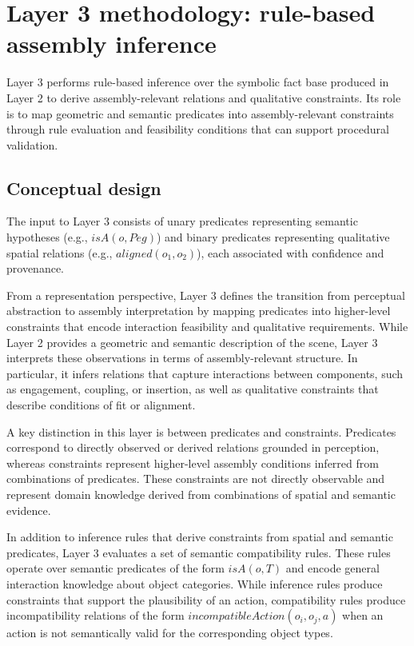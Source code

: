 \documentclass[11pt,titlepage,openright]{book}
\begin{document}
\section{Layer 3 methodology: rule-based assembly inference}
\label{sec:layer3-method}

Layer 3 performs rule-based inference over the symbolic fact base produced in Layer 2 to derive assembly-relevant relations and qualitative constraints. Its role is to map geometric and semantic predicates into assembly-relevant constraints through rule evaluation and feasibility conditions that can support procedural validation.

\subsection{Conceptual design}

The input to Layer 3 consists of unary predicates representing semantic hypotheses (e.g., $isA(o, Peg)$) and binary predicates representing qualitative spatial relations (e.g., $aligned(o_1,o_2)$), each associated with confidence and provenance.

From a representation perspective, Layer 3 defines the transition from perceptual abstraction to assembly interpretation by mapping predicates into higher-level constraints that encode interaction feasibility and qualitative requirements. While Layer 2 provides a geometric and semantic description of the scene, Layer 3 interprets these observations in terms of assembly-relevant structure. In particular, it infers relations that capture interactions between components, such as engagement, coupling, or insertion, as well as qualitative constraints that describe conditions of fit or alignment.

A key distinction in this layer is between predicates and constraints. Predicates correspond to directly observed or derived relations grounded in perception, whereas constraints represent higher-level assembly conditions inferred from combinations of predicates. These constraints are not directly observable and represent domain knowledge derived from combinations of spatial and semantic evidence.

In addition to inference rules that derive constraints from spatial and semantic predicates, Layer 3 evaluates a set of semantic compatibility rules. These rules operate over semantic predicates of the form $isA(o, T)$ and encode general interaction knowledge about object categories.
While inference rules produce constraints that support the plausibility of an action, compatibility rules produce incompatibility relations of the form $incompatibleAction(o_i, o_j, a)$ when an action is not semantically valid for the corresponding object types.
\end{document}
